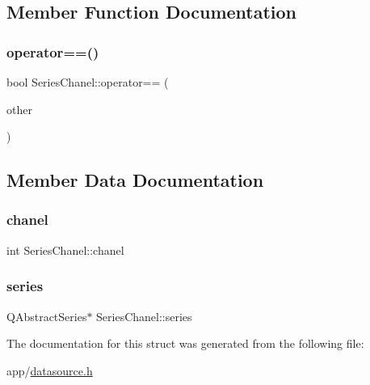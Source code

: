 \subsection{Member Function Documentation}
\hypertarget{struct_series_chanel_a48df63740dd69cd7e34b4f96e1015003}{}\label{struct_series_chanel_a48df63740dd69cd7e34b4f96e1015003} 
\subsubsection{\texorpdfstring{operator==()}{operator==()}}
{\footnotesize\ttfamily bool Series\+Chanel\+::operator== (\begin{DoxyParamCaption}\item[{\hyperlink{struct_series_chanel}{Series\+Chanel}}]{other }\end{DoxyParamCaption})\hspace{0.3cm}{\ttfamily [inline]}}



\subsection{Member Data Documentation}
\hypertarget{struct_series_chanel_aa8765a5a77663bd414058b73f922265f}{}\label{struct_series_chanel_aa8765a5a77663bd414058b73f922265f} 
\subsubsection{\texorpdfstring{chanel}{chanel}}
{\footnotesize\ttfamily int Series\+Chanel\+::chanel}

\hypertarget{struct_series_chanel_a3cb05afb46b3d15a4896b9a534e6a9dc}{}\label{struct_series_chanel_a3cb05afb46b3d15a4896b9a534e6a9dc} 
\subsubsection{\texorpdfstring{series}{series}}
{\footnotesize\ttfamily Q\+Abstract\+Series$\ast$ Series\+Chanel\+::series}



The documentation for this struct was generated from the following file\+:\begin{DoxyCompactItemize}
\item 
app/\hyperlink{datasource_8h}{datasource.\+h}\end{DoxyCompactItemize}

